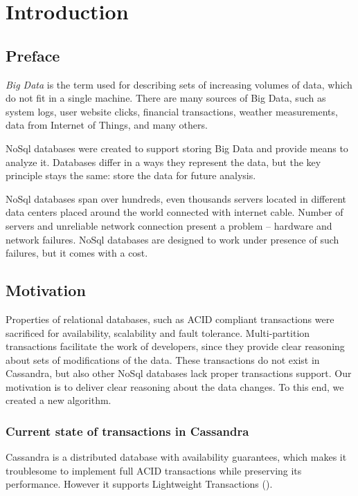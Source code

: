 
\chapter{Introduction}\label{chapter:introduction}

\section{Preface}\label{sec:introduction:preface}
\emph{Big Data} is the term used for describing sets of increasing volumes of data, which do not fit in a single machine. There are many sources of Big Data, such as system logs, user website clicks, financial transactions, weather measurements, data from Internet of Things, and many others. 

NoSql databases were created to support storing Big Data and provide means to analyze it. Databases differ in a ways they represent the data, but the key principle stays the same: store the data for future analysis.

NoSql databases span over hundreds, even thousands servers located in different data centers placed around the world connected with internet cable. Number of servers and unreliable network connection present a problem -- hardware and network failures.
NoSql databases are designed to work under presence of such failures, but it comes with a cost.

\section{Motivation}\label{sec:introduction:motivation}


Properties of relational databases, such as ACID compliant transactions were sacrificed for availability, scalability and fault tolerance. Multi-partition transactions facilitate the work of developers, since they provide clear reasoning about sets of modifications of the data. These transactions do not exist in Cassandra, but also other NoSql databases lack proper transactions support.
Our motivation is to deliver clear reasoning about the data changes. To this end, we created a new algorithm.


\subsection{Current state of transactions in Cassandra}	
Cassandra is a distributed database with availability guarantees, which makes it troublesome to implement full ACID transactions while preserving its performance. However it supports Lightweight Transactions (\lwt).

